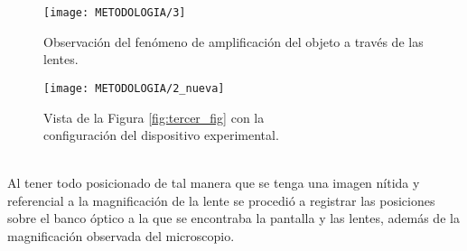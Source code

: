 \documentclass[10pt,a4paper]{article}
\begin{document}
\begin{figure}[ht]
\begin{minipage}{0.5\linewidth}
	\texttt{[image: METODOLOGIA/3]}
	\caption{Observación del fenómeno de amplificación del objeto a través de las lentes.}
	\label{fig:cuarta_fig}
\end{minipage}\hspace{5mm}
\begin{minipage}{0.5\linewidth}
	\texttt{[image: METODOLOGIA/2\_nueva]}
	\caption{Vista de la Figura \ref{fig:tercer_fig} con la\\configuración del dispositivo experimental.}
	\label{fig:quinta_fig}
\end{minipage}
\end{figure}\\
Al tener todo posicionado de tal manera que se tenga una imagen nítida y referencial a la magnificación de la lente se procedió a registrar las posiciones sobre el banco óptico a la que se encontraba la pantalla y las lentes, además de la magnificación observada del microscopio.

\newpage
\end{document}
